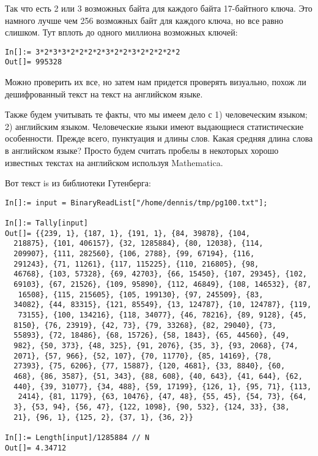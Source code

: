 Так что есть 2 или 3 возможных байта для каждого байта 17-байтного ключа.
Это намного лучше чем 256 возможных байт для каждого ключа, но все равно слишком.
Тут вплоть до одного миллиона возможных ключей:

\begin{lstlisting}[caption=Mathematica,style=custommath]
In[]:= 3*2*3*3*2*2*2*2*3*2*2*3*2*2*2*2*2
Out[]= 995328
\end{lstlisting}

Можно проверить их все, но затем нам придется проверять визуально, похож ли дешифрованный текст на текст на английском языке.

Также будем учитывать те факты, что мы имеем дело с 1) человеческим языком; 2) английским языком.
Человеческие языки имеют выдающиеся статистические особенности.
Прежде всего, пунктуация и длины слов.
Какая средняя длина слова в английском языке?
Просто будем считать пробелы в некоторых хорошо известных текстах на английском используя Mathematica.

Вот текст is \href{http://www.gutenberg.org/cache/epub/100/pg100.txt}{}
из библиотеки Гутенберга:

\begin{lstlisting}[caption=Mathematica,style=custommath]
In[]:= input = BinaryReadList["/home/dennis/tmp/pg100.txt"];

In[]:= Tally[input]
Out[]= {{239, 1}, {187, 1}, {191, 1}, {84, 39878}, {104, 
  218875}, {101, 406157}, {32, 1285884}, {80, 12038}, {114, 
  209907}, {111, 282560}, {106, 2788}, {99, 67194}, {116, 
  291243}, {71, 11261}, {117, 115225}, {110, 216805}, {98, 
  46768}, {103, 57328}, {69, 42703}, {66, 15450}, {107, 29345}, {102, 
  69103}, {67, 21526}, {109, 95890}, {112, 46849}, {108, 146532}, {87,
   16508}, {115, 215605}, {105, 199130}, {97, 245509}, {83, 
  34082}, {44, 83315}, {121, 85549}, {13, 124787}, {10, 124787}, {119,
   73155}, {100, 134216}, {118, 34077}, {46, 78216}, {89, 9128}, {45, 
  8150}, {76, 23919}, {42, 73}, {79, 33268}, {82, 29040}, {73, 
  55893}, {72, 18486}, {68, 15726}, {58, 1843}, {65, 44560}, {49, 
  982}, {50, 373}, {48, 325}, {91, 2076}, {35, 3}, {93, 2068}, {74, 
  2071}, {57, 966}, {52, 107}, {70, 11770}, {85, 14169}, {78, 
  27393}, {75, 6206}, {77, 15887}, {120, 4681}, {33, 8840}, {60, 
  468}, {86, 3587}, {51, 343}, {88, 608}, {40, 643}, {41, 644}, {62, 
  440}, {39, 31077}, {34, 488}, {59, 17199}, {126, 1}, {95, 71}, {113,
   2414}, {81, 1179}, {63, 10476}, {47, 48}, {55, 45}, {54, 73}, {64, 
  3}, {53, 94}, {56, 47}, {122, 1098}, {90, 532}, {124, 33}, {38, 
  21}, {96, 1}, {125, 2}, {37, 1}, {36, 2}}

In[]:= Length[input]/1285884 // N
Out[]= 4.34712
\end{lstlisting}

